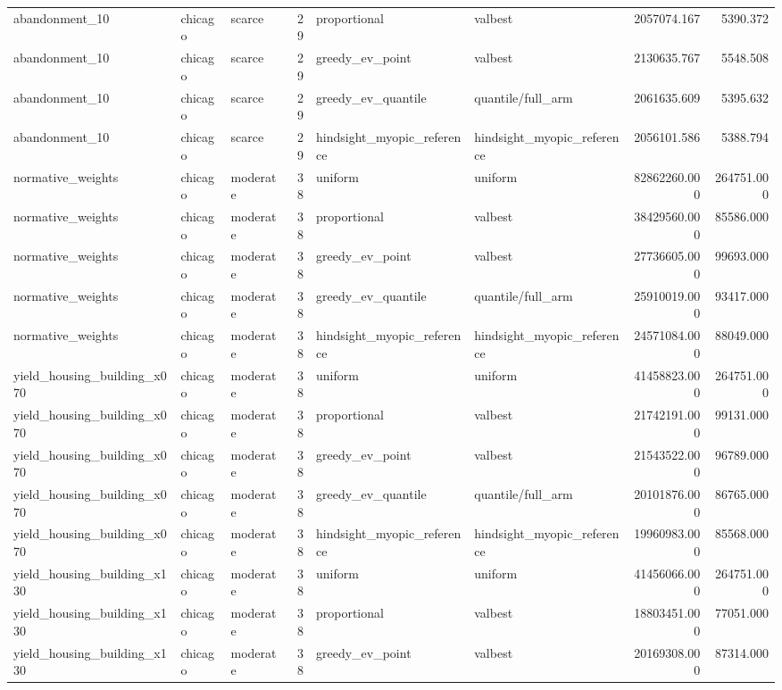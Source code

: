 \begin{tabular}{lllrllrr}
abandonment\_10 & chicago & scarce & 29 & proportional & valbest & 2057074.167 & 5390.372 \\
abandonment\_10 & chicago & scarce & 29 & greedy\_ev\_point & valbest & 2130635.767 & 5548.508 \\
abandonment\_10 & chicago & scarce & 29 & greedy\_ev\_quantile & quantile/full\_arm & 2061635.609 & 5395.632 \\
abandonment\_10 & chicago & scarce & 29 & hindsight\_myopic\_reference & hindsight\_myopic\_reference & 2056101.586 & 5388.794 \\
normative\_weights & chicago & moderate & 38 & uniform & uniform & 82862260.000 & 264751.000 \\
normative\_weights & chicago & moderate & 38 & proportional & valbest & 38429560.000 & 85586.000 \\
normative\_weights & chicago & moderate & 38 & greedy\_ev\_point & valbest & 27736605.000 & 99693.000 \\
normative\_weights & chicago & moderate & 38 & greedy\_ev\_quantile & quantile/full\_arm & 25910019.000 & 93417.000 \\
normative\_weights & chicago & moderate & 38 & hindsight\_myopic\_reference & hindsight\_myopic\_reference & 24571084.000 & 88049.000 \\
yield\_housing\_building\_x070 & chicago & moderate & 38 & uniform & uniform & 41458823.000 & 264751.000 \\
yield\_housing\_building\_x070 & chicago & moderate & 38 & proportional & valbest & 21742191.000 & 99131.000 \\
yield\_housing\_building\_x070 & chicago & moderate & 38 & greedy\_ev\_point & valbest & 21543522.000 & 96789.000 \\
yield\_housing\_building\_x070 & chicago & moderate & 38 & greedy\_ev\_quantile & quantile/full\_arm & 20101876.000 & 86765.000 \\
yield\_housing\_building\_x070 & chicago & moderate & 38 & hindsight\_myopic\_reference & hindsight\_myopic\_reference & 19960983.000 & 85568.000 \\
yield\_housing\_building\_x130 & chicago & moderate & 38 & uniform & uniform & 41456066.000 & 264751.000 \\
yield\_housing\_building\_x130 & chicago & moderate & 38 & proportional & valbest & 18803451.000 & 77051.000 \\
yield\_housing\_building\_x130 & chicago & moderate & 38 & greedy\_ev\_point & valbest & 20169308.000 & 87314.000 \\

\end{tabular}
